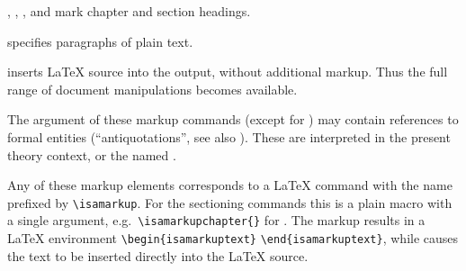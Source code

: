 \begin{isabellebody}
\begin{isamarkuptext}
\begin{descr}
  \item [\mbox{\isa{\isacommand{chapter}}}, \mbox{\isa{\isacommand{section}}}, \mbox{\isa{\isacommand{subsection}}}, and \mbox{\isa{\isacommand{subsubsection}}}] mark chapter and
  section headings.

  \item [\mbox{\isa{\isacommand{text}}}] specifies paragraphs of plain text.

  \item [\mbox{\isa{\isacommand{text{\isacharunderscore}raw}}}] inserts {\LaTeX} source into the
  output, without additional markup.  Thus the full range of document
  manipulations becomes available.

  \end{descr}

  The  argument of these markup commands (except for
  \mbox{}) may contain references to formal entities
  (``antiquotations'', see also ).  These are
  interpreted in the present theory context, or the named .

  Any of these markup elements corresponds to a {\LaTeX} command with
  the name prefixed by \verb|\isamarkup|.  For the sectioning
  commands this is a plain macro with a single argument, e.g.\
  \verb|\isamarkupchapter{|\isa{{\isachardoublequote}{\isasymdots}{\isachardoublequote}}\verb|}| for
  \mbox{\isa{\isacommand{chapter}}}.  The \mbox{\isa{\isacommand{text}}} markup results in a
  {\LaTeX} environment \verb|\begin{isamarkuptext}| \isa{{\isachardoublequote}{\isasymdots}{\isachardoublequote}} \verb|\end{isamarkuptext}|, while \mbox{}
  causes the text to be inserted directly into the {\LaTeX} source.


\end{isamarkuptext}
\end{isabellebody}

